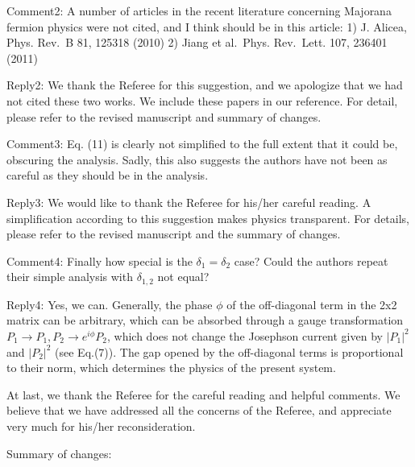 \documentclass[11pt]{article}
\begin{document}
Comment2: A number of articles in the recent literature concerning
Majorana fermion physics were not cited, and I think should be in this
article: 1) J. Alicea, Phys. Rev.~B 81, 125318 (2010) 2) Jiang et
al.~Phys. Rev.~Lett. 107, 236401 (2011)

Reply2: We thank the Referee for this suggestion, and we apologize that
we had not cited these two works. We include these papers in our
reference. For detail, please refer to the revised manuscript and
summary of changes.

Comment3: Eq. (11) is clearly not simplified to the full extent that it
could be, obscuring the analysis. Sadly, this also suggests the authors
have not been as careful as they should be in the analysis.

Reply3: We would like to thank the Referee for his/her careful reading.
A simplification according to this suggestion makes physics transparent.
For details, please refer to the revised manuscript and the summary of
changes.

Comment4: Finally how special is the \(\delta_1 = \delta_2\) case? Could
the authors repeat their simple analysis with \(\delta_{1,2}\) not
equal?

Reply4: Yes, we can. Generally, the phase \(\phi\) of the off-diagonal
term in the 2x2 matrix can be arbitrary, which can be absorbed through a
gauge transformation
\(P_1\rightarrow P_1, P_2\rightarrow e^{i\phi} P_2\), which does not
change the Josephson current given by \(|P_1|^2\) and \(|P_2|^2\) (see
Eq.(7)). The gap opened by the off-diagonal terms is proportional to
their norm, which determines the physics of the present system.

At last, we thank the Referee for the careful reading and helpful
comments. We believe that we have addressed all the concerns of the
Referee, and appreciate very much for his/her reconsideration.

Summary of changes:
\end{document}

